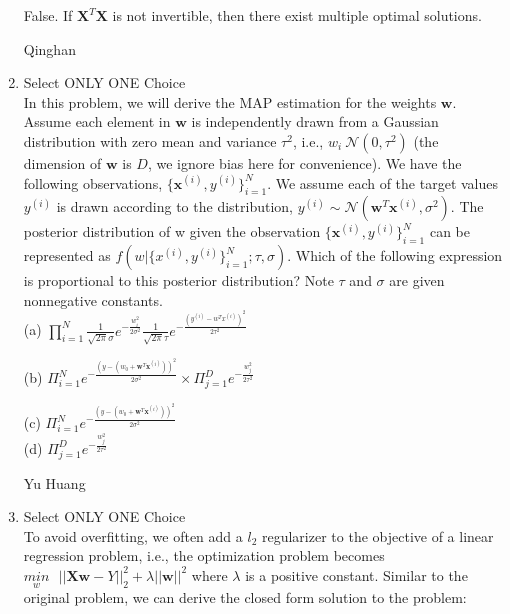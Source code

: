 \begin{enumerate}
    \begin{soln}
    False. If $\mathbf{X}^T \mathbf{X}$ is not invertible, then there exist multiple optimal solutions.
    \end{soln}
    
    \begin{qauthor}
    Qinghan
    \end{qauthor}
    
    \item Select ONLY ONE Choice\\
    In this problem, we will derive the MAP estimation for the weights $\mathbf{w}$. Assume each element in $\mathbf{w}$ is independently drawn from a Gaussian distribution with zero mean and variance $\tau^{2}$, i.e., $w_{i} ~ \mathcal{N}(0,\tau^{2})$ (the dimension of $\mathbf{w}$ is $D$, we ignore bias here for convenience). We have the following observations, $\{\mathbf{x}^{(i)},y^{(i)}\}_{i=1}^{N}$. We assume each of the target values $y^{(i)}$ is drawn according to the distribution, $y^{(i)}\sim\mathcal{N}(\mathbf{w}^{T}\mathbf{x}^{(i)},\sigma^{2})$. The posterior distribution of w given the observation $\{\mathbf{x}^{(i)},y^{(i)}\}_{i=1}^{N}$ can be represented as $f(w|\{x^{(i)},y^{(i)}\}_{i=1}^{N};\tau,\sigma)$. Which of the following expression is proportional to this posterior distribution? Note $\tau$ and $\sigma$ are given nonnegative constants.\\
    (a) $\prod_{i=1}^{N}\frac{1}{\sqrt{2\pi}\sigma}e^{-\frac{w_{i}^{2}}{2\sigma^{2}}}\frac{1}{\sqrt{2\pi}\tau}e^{-\frac{\left(y^{(i)}-w^{T}x^{(i)}\right)^{2}}{2\tau^{2}}}$\\
    \begin{soln}
    (b) $\Pi_{i=1}^{N}e^{-\frac{(y-(w_{0}+\mathbf{w}^{T}\mathbf{x}^{(i)}))^{2}}{2\sigma^{2}}}\times\Pi_{j=1}^{D}e^{-\frac{w_{j}^{2}}{2\tau^{2}}}$\\
    \end{soln}

    (c) $\Pi_{i=1}^{N}e^{-\frac{(y-(w_{0}+\mathbf{w}^{T}\mathbf{x}^{(i)}))^{2}}{2\sigma^{2}}}$\\

    (d) $\Pi_{j=1}^{D}e^{-\frac{w_{j}^{2}}{2\tau^{2}}}$\\
    
    \begin{qauthor}
    Yu Huang
    \end{qauthor}
    
    \item Select ONLY ONE Choice\\
    To avoid overfitting, we often add a $l_{2}$ regularizer to the objective of a linear regression problem, i.e., the optimization problem becomes $\underset{w}{min}\text{ }||\mathbf{X}\mathbf{w}-Y||_{2}^{2}+\lambda||\mathbf{w}||^{2}$ where $\lambda$ is a positive constant. Similar to the original problem, we can derive the closed form solution to the problem:


\end{enumerate}
